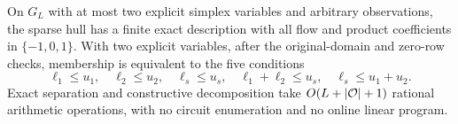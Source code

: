 \begin{theorem}\label{thm:two-state-chain}
On $G_L$ with at most two explicit simplex variables and arbitrary
observations, the sparse hull has a finite exact description with
all flow and product coefficients in $\{-1,0,1\}$.
With two explicit variables, after the original-domain and zero-row
checks, membership is equivalent to the five conditions
\begin{equation}\label{eq:chain-five-tests}
 \ell_1\le u_1,\quad \ell_2\le u_2,\quad
 \ell_s\le u_s,\quad
 \ell_1+\ell_2\le u_s,\quad
 \ell_s\le u_1+u_2.
\end{equation}
Exact separation and constructive decomposition take
$O(L+|\mathcal O|+1)$ rational arithmetic operations, with no circuit
enumeration and no online linear program.
\end{theorem}
